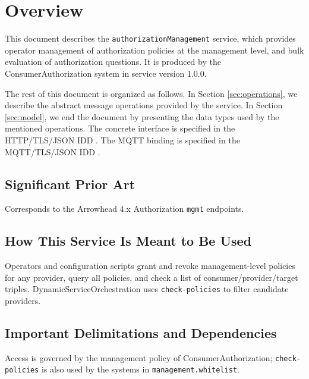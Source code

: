 \documentclass[a4paper]{arrowhead}
\begin{document}
\section{Overview}
\label{sec:overview}

This document describes the \texttt{authorization\allowbreak{}Management} service, which provides operator management of authorization policies at the management level, and bulk evaluation of authorization questions.
It is produced by the ConsumerAuthorization system \cite{ca-sysd} in service version 1.0.0.

The rest of this document is organized as follows.
In Section \ref{sec:operations}, we describe the abstract message operations provided by the service.
In Section \ref{sec:model}, we end the document by presenting the data types used by the mentioned operations.
The concrete interface is specified in the HTTP/TLS/JSON IDD \cite{ca-authorizationManagement-http-idd}. The MQTT binding is specified in the MQTT/TLS/JSON IDD \cite{ca-authorizationManagement-mqtt-idd}.

\subsection{Significant Prior Art}

Corresponds to the Arrowhead 4.x Authorization \texttt{mgmt} endpoints.

\subsection{How This Service Is Meant to Be Used}

Operators and configuration scripts grant and revoke management-level policies for any provider, query all policies, and check a list of consumer/provider/target triples. Dynamic\allowbreak{}Service\allowbreak{}Orchestration uses \texttt{check-\allowbreak{}policies} to filter candidate providers.

\subsection{Important Delimitations and Dependencies}
\label{sec:delimitations}

Access is governed by the management policy of Consumer\allowbreak{}Authorization; \texttt{check-\allowbreak{}policies} is also used by the systems in \texttt{management.\allowbreak{}whitelist}.

\newpage
\end{document}
